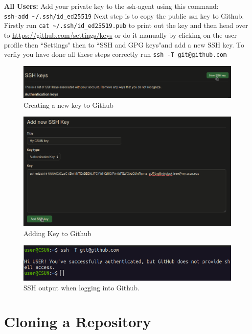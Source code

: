 \documentclass[12pt, a4paper]{article}
\begin{document}
\noindent \textbf{All Users:} Add your private key to the ssh-agent using this command:\\
\verb`ssh-add ~/.ssh/id_ed25519` Next step is to copy the public ssh key to Github. Firstly run \verb`cat ~/.ssh/id_ed25519.pub` to print out the key and then head over to \url{https://github.com/settings/keys} or do it manually by clicking on the user profile then ``Settings" then to ``SSH and GPG keys"and add a new SSH key. To verfiy you have done all these steps correctly run \texttt{ssh -T git@github.com} 
\begin{figure}[H]
\centering
\includegraphics[scale=0.4]{../images/workshop-I/GH-new-key.png}
\caption{Creating a new key to Github}
\end{figure}
\begin{figure}[H]
\centering
\includegraphics[scale=0.5]{../images/workshop-I/GH-add-key.png}
\caption{Adding Key to Github}
\end{figure}
\begin{figure}[H]
\centering
\includegraphics[scale=0.5]{../images/workshop-I/ssh-T.png}
\caption{SSH output when logging into Github.}
\end{figure}

\section{Cloning a Repository}
\end{document}
